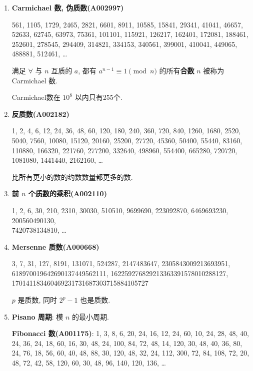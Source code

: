 \begin{enumerate}
    \item \textbf{Carmichael 数, 伪质数(A002997)}

          561, 1105, 1729, 2465, 2821, 6601, 8911, 10585, 15841, 29341, 41041, 46657, 52633, 62745, 63973, 75361, 101101, 115921, 126217, 162401, 172081, 188461, 252601, 278545, 294409, 314821, 334153, 340561, 399001, 410041, 449065, 488881, 512461, \dots

          满足 \(\forall\) 与 \(n\) 互质的 \(a\), 都有 \(a ^ {n - 1} \equiv 1 \pmod n\) 的所有\textbf{合数} \(n\) 被称为 Carmichael 数.

          Carmichael数在 \(10^8\) 以内只有255个.

    \item \textbf{反质数(A002182)}

          1, 2, 4, 6, 12, 24, 36, 48, 60, 120, 180, 240, 360, 720, 840, 1260, 1680, 2520, 5040, 7560, 10080, 15120, 20160, 25200, 27720, 45360, 50400, 55440, 83160, 110880, 166320, 221760, 277200, 332640, 498960, 554400, 665280, 720720, 1081080, 1441440, 2162160, \dots

          比所有更小的数的约数数量都更多的数.

    \item \textbf{前 \(n\) 个质数的乘积(A002110)}

          1, 2, 6, 30, 210, 2310, 30030, 510510, 9699690, 223092870, 6469693230, 200560490130,\\7420738134810, \dots

    \item \textbf{Mersenne 质数(A000668)}

          3, 7, 31, 127, 8191, 131071, 524287, 2147483647, 2305843009213693951,\\618970019642690137449562111, 162259276829213363391578010288127,\\170141183460469231731687303715884105727

          \(p\) 是质数, 同时 \(2^p - 1\) 也是质数.

    \item \textbf{Pisano 周期}: 模 \(n\) 的最小周期.

          \textbf{Fibonacci 数(A001175)}: 1, 3, 8, 6, 20, 24, 16, 12, 24, 60, 10, 24, 28, 48, 40, 24, 36, 24, 18, 60, 16, 30, 48, 24, 100, 84, 72, 48, 14, 120, 30, 48, 40, 36, 80, 24, 76, 18, 56, 60, 40, 48, 88, 30, 120, 48, 32, 24, 112, 300, 72, 84, 108, 72, 20, 48, 72, 42, 58, 120, 60, 30, 48, 96, 140, 120, 136, \dots


\end{enumerate}
